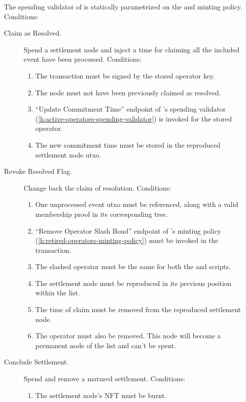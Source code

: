 \documentclass[../midgard.tex]{subfiles}
\begin{document}
The spending validator of  is statically parametrized on the  and  minting policy.
Conditions:
\begin{description}
    \item[Claim as Resolved.] Spend a settlement node and inject a time for claiming all the included event have been processed.
      Conditions:
        \begin{enumerate}
            \item The transaction must be signed by the stored operator key.
            \item The node must not have been previously claimed as resolved.
            \item ``Update Commitment Time'' endpoint of 's spending validator (\ref{h:active-operators-spending-validator}) is invoked for the stored operator.
            \item The new commitment time must be stored in the reproduced settlement node utxo.
        \end{enumerate}
    \item[Revoke Resolved Flag.] Change back the claim of resolution.
      Conditions:
        \begin{enumerate}
            \item One unprocessed event utxo must be referenced, along with a valid membership proof in its corresponding tree.
            \item ``Remove Operator Slash Bond'' endpoint of 's minting policy (\ref{h:retired-operators-minting-policy}) must be invoked in the transaction.
            \item The slashed operator must be the same for both the  and  scripts.
            \item The settlement node must be reproduced in its previous position within the  list.
            \item The time of claim must be removed from the reproduced settlement node.
            \item The operator must also be removed. This node will become a permanent node of the  list and can't be spent.
        \end{enumerate}
    \item[Conclude Settlement.] Spend and remove a matured settlement.
      Conditions:
        \begin{enumerate}
            \item The settlement node's NFT must be burnt.
        \end{enumerate}
\end{description}
\end{document}
